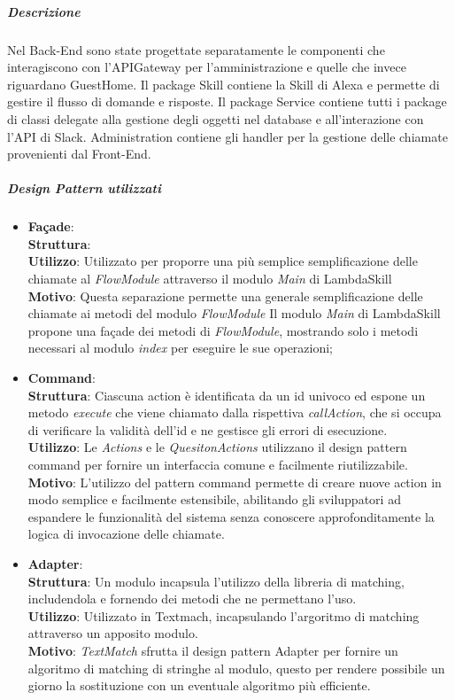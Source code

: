 \documentclass[../DefinizioneDiProdotto_v3.0.0.tex]{subfiles}
\begin{document}
\subparagraph{Descrizione}
Nel Back-End sono state progettate separatamente le componenti che interagiscono con l'APIGateway per l'amministrazione e quelle che invece riguardano GuestHome. Il package Skill contiene la Skill di Alexa e permette di gestire il flusso di domande e risposte. Il package Service contiene tutti i package di classi delegate alla gestione degli oggetti nel database e all'interazione con l'API di Slack. Administration contiene gli handler per la gestione delle chiamate provenienti dal Front-End.

\subparagraph{Design Pattern utilizzati}
\begin{itemize}

	\item \textbf{Façade}:\\
	\textbf{Struttura}: \\
	\textbf{Utilizzo}: Utilizzato per proporre una più semplice semplificazione delle chiamate al \textit{FlowModule} attraverso il modulo \textit{Main} di LambdaSkill\\
	\textbf{Motivo}: Questa separazione permette una generale semplificazione delle chiamate ai metodi del modulo \textit{FlowModule}
	 Il modulo \textit{Main} di LambdaSkill propone una façade dei metodi di \textit{FlowModule}, mostrando solo i metodi necessari al modulo \textit{index} per eseguire le sue operazioni;
	
	\item \textbf{Command}: \\
	\textbf{Struttura}: Ciascuna action è identificata da un id univoco ed espone un metodo \textit{execute} che viene chiamato dalla rispettiva \textit{callAction}, che si occupa di verificare la validità dell'id e ne gestisce gli errori di esecuzione.\\
	\textbf{Utilizzo}:  Le \textit{Actions} e le \textit{QuesitonActions} utilizzano il design pattern command per fornire un interfaccia comune e facilmente riutilizzabile. \\
	\textbf{Motivo}: L'utilizzo del pattern command permette di creare nuove action in modo semplice e facilmente estensibile, abilitando gli sviluppatori ad espandere le funzionalità del sistema senza conoscere approfonditamente la logica di invocazione delle chiamate.
	
	\item \textbf{Adapter}:\\
	\textbf{Struttura}: Un modulo incapsula l'utilizzo della libreria di matching, includendola e fornendo dei metodi che ne permettano l'uso.\\
	\textbf{Utilizzo}: Utilizzato in Textmach, incapsulando l'argoritmo di matching attraverso un apposito modulo.\\
	\textbf{Motivo}: \textit{TextMatch} sfrutta il design pattern Adapter per fornire un algoritmo di matching di stringhe al modulo, questo per rendere possibile un giorno la sostituzione con un eventuale algoritmo più efficiente. 
\end{itemize}
\end{document}
